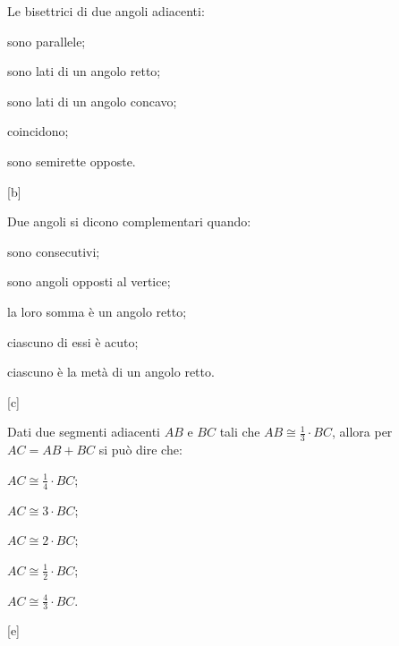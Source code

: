 \begin{esercizio}
\label{ese:1.69}
Le bisettrici di due angoli adiacenti:
\vspace{-.5em}
\begin{multicols}{2}
\begin{enumeratea}
\item sono parallele;
\item sono lati di un angolo retto;
\item sono lati di un angolo concavo;
\item coincidono;
\item sono semirette opposte.
\end{enumeratea}
\end{multicols}
\vspace{-18pt}
\hfill[b]
\end{esercizio}

\begin{esercizio}
\label{ese:1.70}
Due angoli si dicono complementari quando:
\vspace{-.5em}
\begin{multicols}{2}
\begin{enumeratea}
\item sono consecutivi;
\item sono angoli opposti al vertice;
\item la loro somma è un angolo retto;
\item ciascuno di essi è acuto;
\item ciascuno è la metà di un angolo retto.
\end{enumeratea}
\end{multicols}
\vspace{-18pt}
\hfill[c]
\end{esercizio}

\begin{esercizio}
\label{ese:1.71}
Dati due segmenti adiacenti $AB$ e $BC$ tali che $AB\cong 
\frac{1}{3}\cdot BC$, allora per $AC=AB+BC$ si può dire che:
\vspace{-.5em}
\begin{multicols}{3}
\begin{enumeratea}
\item $AC\cong \frac{1}{4}\cdot BC$;
\item $AC\cong 3\cdot BC$;
\item $AC\cong 2\cdot BC$;
\item $AC\cong \frac{1}{2}\cdot BC$;
\item $AC\cong \frac{4}{3}\cdot BC$.
\end{enumeratea}
\end{multicols}
\vspace{-18pt}
\hfill[e]
\end{esercizio}

